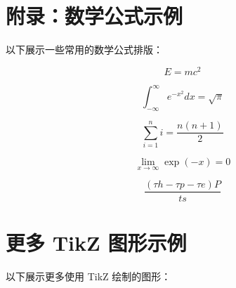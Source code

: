 \documentclass{article}
\begin{document}
\newpage
\lipsum[1-3]

\section{附录：数学公式示例}

以下展示一些常用的数学公式排版：

\begin{equation}
    E = mc^2
\end{equation}

\begin{equation}
    \int_{-\infty}^{\infty} e^{-x^2} dx = \sqrt{\pi}
\end{equation}

\begin{equation}
    \sum_{i=1}^{n} i = \frac{n(n+1)}{2}
\end{equation}
    
\begin{equation}
    \lim_{x \to \infty} \exp(-x) = 0
\end{equation}

\begin{equation}
    \frac{(\tau h-\tau p-\tau e)P}{ts}
\end{equation}

\section{更多 TikZ 图形示例}

以下展示更多使用 TikZ 绘制的图形：
\end{document}
